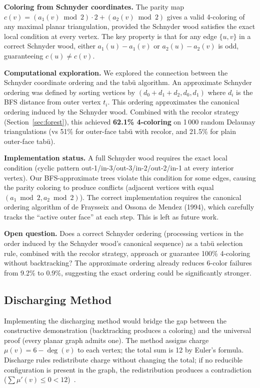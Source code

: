 \documentclass[12pt,letterpaper]{article}
\theoremstyle{plain}
\theoremstyle{definition}
\theoremstyle{remark}
\newcommand{\degr}{\operatorname{deg}}
\begin{document}
\textbf{Coloring from Schnyder coordinates.} The parity map
$c(v) = (a_1(v) \bmod 2) \cdot 2 + (a_2(v) \bmod 2)$ gives a valid 4-coloring
of any maximal planar triangulation, provided the Schnyder wood satisfies the
exact local condition at every vertex. The key property is that for any edge
$\{u,v\}$ in a correct Schnyder wood, either $a_1(u) - a_1(v)$ or
$a_2(u) - a_2(v)$ is odd, guaranteeing $c(u) \neq c(v)$.

\textbf{Computational exploration.} We explored the connection between the
Schnyder coordinate ordering and the tab\"{u} algorithm. An approximate Schnyder
ordering was defined by sorting vertices by $(d_0+d_1+d_2, d_0, d_1)$ where
$d_i$ is the BFS distance from outer vertex $t_i$. This ordering approximates
the canonical ordering induced by the Schnyder wood. Combined with the recolor
strategy (Section~\ref{sec:forest}), this achieved \textbf{62.1\% 4-coloring}
on 1\,000 random Delaunay triangulations (vs 51\% for outer-face tab\"{u} with
recolor, and 21.5\% for plain outer-face tab\"{u}).

\textbf{Implementation status.} A full Schnyder wood requires the exact local
condition (cyclic pattern out-1/in-3/out-3/in-2/out-2/in-1 at every interior
vertex). Our BFS-approximate trees violate this condition for some edges, causing
the parity coloring to produce conflicts (adjacent vertices with equal
$(a_1 \bmod 2, a_2 \bmod 2)$). The correct implementation requires the canonical
ordering algorithm of de Fraysseix and Ossona de Mendez (1994), which carefully
tracks the ``active outer face'' at each step. This is left as future work.

\textbf{Open question.} Does a correct Schnyder ordering (processing vertices in
the order induced by the Schnyder wood's canonical sequence) as a tab\"{u}
selection rule, combined with the recolor strategy, approach or guarantee 100\%
4-coloring without backtracking? The approximate ordering already reduces
6-color failures from 9.2\% to 0.9\%, suggesting the exact ordering could be
significantly stronger.


\subsection{Discharging Method}

Implementing the discharging method would bridge the gap between the
constructive demonstration (backtracking produces a coloring) and the universal
proof (every planar graph admits one). The method assigns charge
$\mu(v) = 6 - \degr(v)$ to each vertex; the total sum is 12 by Euler's
formula. Discharge rules redistribute charge without changing the total; if no
reducible configuration is present in the graph, the redistribution produces a
contradiction ($\sum \mu'(v) \leq 0 < 12$)~\cite{robertson1997}.
\end{document}
